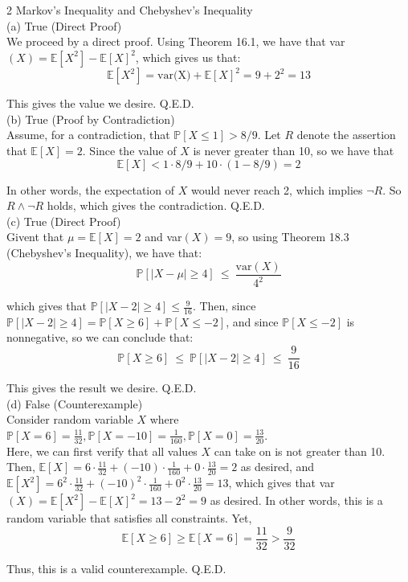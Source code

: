 \documentclass{article}
\begin{document}
{\Large 2 Markov’s Inequality and Chebyshev’s Inequality} \\[.5cm]
{\color{red} (a) True (Direct Proof) } \\

We proceed by a direct proof. Using Theorem 16.1, we have that var$(X) = \mathbb{E}[X^2] - \mathbb{E}[X]^2$, which gives us that:
$$\mathbb{E}[X^2] = \text{var(X)} + \mathbb{E}[X]^2 = 9 + 2^2 = 13$$

This gives the value we desire. Q.E.D. \\[.5cm]
{\color{red} (b) True (Proof by Contradiction) } \\

Assume, for a contradiction, that $\mathbb{P}[X\leq1]>8/9$. Let $R$ denote the assertion that $\mathbb{E}[X] = 2$. Since the value of $X$ is never greater than 10, so we have that $$\mathbb{E}[X] < 1\cdot8/9 + 10\cdot(1-8/9) = 2$$

In other words, the expectation of $X$ would never reach 2, which implies $\neg R$. So $R\land\neg R$ holds, which gives the contradiction. Q.E.D. \\[.5cm]
{\color{red} (c) True (Direct Proof) } \\

Givent that $\mu = \mathbb{E}[X] = 2$ and var$(X) = 9$, so using Theorem 18.3 (Chebyshev's Inequality), we have that:
$$\mathbb{P}[|X-\mu|\geq4]\ \leq\ \frac{\text{var}(X)}{4^2}$$

which gives that $\mathbb{P}[|X-2|\geq4]\leq\frac{9}{16}$. Then, since 
$\mathbb{P}[|X-2|\geq4] = \mathbb{P}[X\geq6] + \mathbb{P}[X\leq-2]$, and since $\mathbb{P}[X\leq-2]$ is nonnegative, so we can conclude that:
$$\mathbb{P}[X\geq6]\ \leq\ \mathbb{P}[|X-2|\geq4]\ \leq\ \frac{9}{16}$$

This gives the result we desire. Q.E.D. \\[.5cm]
{\color{red} (d) False (Counterexample) } \\

Consider random variable $X$ where $\mathbb{P}[X=6] = \frac{11}{32}, \mathbb{P}[X=-10] = \frac{1}{160}, \mathbb{P}[X=0] = \frac{13}{20}$. \\

Here, we can first verify that all values $X$ can take on is not greater than 10. Then,
$\mathbb{E}[X] = 6\cdot\frac{11}{32} + (-10)\cdot\frac{1}{160} + 0\cdot\frac{13}{20} = 2$ as desired, and
$\mathbb{E}[X^2] = 6^2\cdot\frac{11}{32} + (-10)^2\cdot\frac{1}{160} + 0^2\cdot\frac{13}{20} = 13$, which gives that var$(X) = \mathbb{E}[X^2] - \mathbb{E}[X]^2 = 13-2^2 = 9$ as desired. In other words, this is a random variable that satisfies all constraints. Yet,
$$\mathbb{E}[X\geq6]\geq\mathbb{E}[X=6] = \frac{11}{32} > \frac{9}{32}$$

Thus, this is a valid counterexample. Q.E.D.
\end{document}
